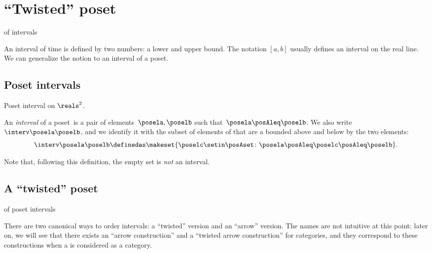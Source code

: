 
\section{``Twisted''  poset} of intervals

An interval of time is defined by two numbers: a lower and upper bound.
The notation $[a,b]$ usually defines an interval on the real line.
We can generalize the notion to an interval of a poset.

\subsection{Poset intervals}
\begin{marginfigure}
    \centering
    \caption{Poset interval on $\reals^2$.}
    \label{fig:int_posets}
\end{marginfigure}

\begin{definition}[Interval]
    \label{def:interval}
    An \emph{interval} of a poset~\posA is a pair of elements~$\posela, \poselb$ such that~$\posela \posAleq \poselb$.
    We also write $\interv \posela \poselb$, and we identify it with the subset of elements of \posA that are a bounded above and below by the two elements:
    \begin{equation}\label{eq:interval}
        \interv \posela \poselb
        \definedas
        \makeset{
            \poselc \setin \posAset \colon
            \posela \posAleq \poselc \posAleq \poselb
        }.
    \end{equation}
\end{definition}

Note that, following this definition, the empty set is \emph{not} an interval.

\subsection{A ``twisted''  poset} of  poset intervals

There are two canonical ways to order  intervals: a ``twisted'' version and an ``arrow'' version.
The names are not intuitive at this point: later on, we will see that there exists an ``arrow construction'' and a ``twisted arrow construction'' for categories, and they correspond to these constructions when a  is considered as a category.

